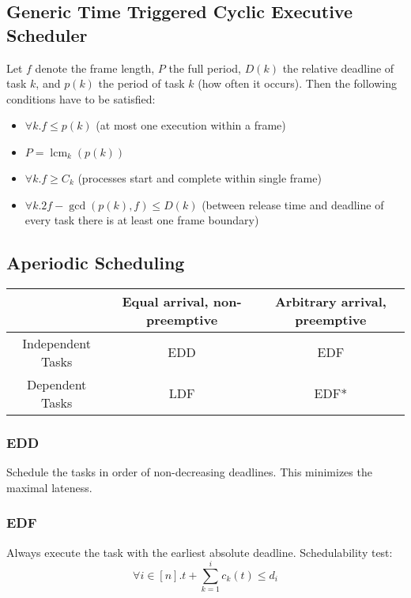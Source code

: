 \documentclass[a4paper,titlepage]{article}
\DeclareMathOperator{\lcm}{lcm}
\begin{document}
\subsection{Generic Time Triggered Cyclic Executive Scheduler}
Let $f$ denote the frame length, $P$ the full period, $D(k)$ the relative deadline of task $k$,
and $p(k)$ the period of task $k$ (how often it occurs). Then the following
conditions have to be satisfied:
\begin{itemize}
	\item $\forall k . f \leq p(k)$ (at most one execution within a frame)
	\item $P = \lcm_k\left(p(k)\right)$
	\item $\forall k . f \geq C_k$ (processes start and complete within single frame)
	\item $\forall k . 2f - \gcd\left(p(k),f\right) \leq D(k)$ (between release time and deadline of every task there is at least one frame boundary)
\end{itemize}

\subsection{Aperiodic Scheduling}
\begin{center}
	{\renewcommand{\arraystretch}{2}
	\begin{tabular}{|c|c|c|}
		\hline
							& Equal arrival, non-preemptive	& Arbitrary arrival, preemptive \tabularnewline\hline
		Independent Tasks	& EDD							& EDF							\tabularnewline\hline
		Dependent Tasks		& LDF							& EDF*							\tabularnewline\hline
	\end{tabular}}
\end{center}

\subsubsection{EDD}
Schedule the tasks in order of non-decreasing deadlines. This minimizes the
maximal lateness.

\subsubsection{EDF}
Always execute the task with the earliest absolute deadline.
Schedulability test:
\begin{equation*}
	\forall i \in [n] . t + \sum_{k = 1}^{i} c_k(t) \leq d_i
\end{equation*}
\end{document}
